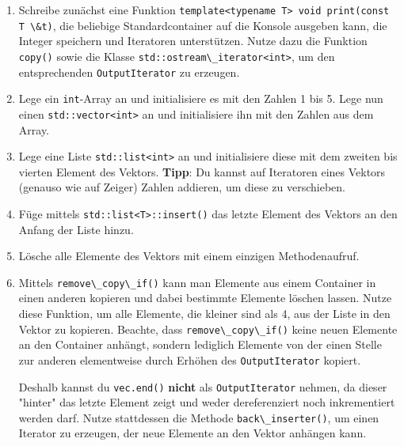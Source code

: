 \begin{enumerate}
\item 
Schreibe zunächst eine Funktion \lstinline{template<typename T> void print(const T \&t)}, die beliebige Standardcontainer auf die Konsole ausgeben kann, die Integer speichern und Iteratoren unterstützen.
Nutze dazu die Funktion \lstinline{copy()} sowie die Klasse \lstinline{std::ostream\_iterator<int>}, um den entsprechenden \lstinline{OutputIterator} zu erzeugen.

\item
Lege ein \lstinline{int}-Array an und initialisiere es mit den Zahlen 1 bis 5.
Lege nun einen \lstinline{std::vector<int>} an und initialisiere ihn mit den Zahlen aus dem Array.

\item
Lege eine Liste \lstinline{std::list<int>} an und initialisiere diese mit dem zweiten bis vierten Element des Vektors.
\textbf{Tipp}: Du kannst auf Iteratoren eines Vektors (genauso wie auf Zeiger) Zahlen addieren, um diese zu verschieben.

\item
Füge mittels \lstinline{std::list<T>::insert()} das letzte Element des Vektors an den Anfang der Liste hinzu.

\item
Lösche alle Elemente des Vektors mit einem einzigen Methodenaufruf.

\item
Mittels \lstinline{remove\_copy\_if()} kann man Elemente aus einem Container in einen anderen kopieren und dabei bestimmte Elemente löschen lassen.
Nutze diese Funktion, um alle Elemente, die kleiner sind als 4, aus der Liste in den Vektor zu kopieren. Beachte, dass \lstinline{remove\_copy\_if()} keine neuen Elemente an den Container anhängt, sondern lediglich Elemente von der einen Stelle zur anderen elementweise durch Erhöhen des \lstinline{OutputIterator} kopiert.

Deshalb kannst du \lstinline{vec.end()} \textbf{nicht} als \lstinline{OutputIterator} nehmen, da dieser "{}hinter"{} das letzte Element zeigt und weder dereferenziert noch inkrementiert werden darf. Nutze stattdessen die Methode \lstinline{back\_inserter()}, um einen Iterator zu erzeugen, der neue Elemente an den Vektor anhängen kann.
\end{enumerate}
